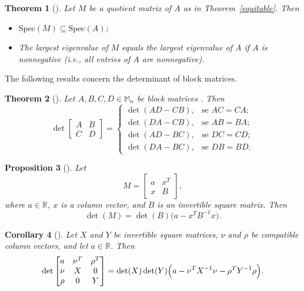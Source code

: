 \documentclass{article}
\newtheorem{theorem}{Theorem}[section]
\newtheorem{corollary}[theorem]{Corollary}
\newtheorem{proposition}[theorem]{Proposition}
\begin{document}
\begin{theorem}[\cite{YOU2019}] \label{quociente}
Let $M$ be a quotient matrix of $A$ as in Theorem~\ref{equitable}. Then
\begin{itemize}
\item[(i)] $\mathrm{Spec}(M) \subseteq \mathrm{Spec}(A)$;
\item[(ii)] The largest eigenvalue of $M$ equals the largest eigenvalue of $A$ if $A$ is nonnegative (i.e., all entries of $A$ are nonnegative).
\end{itemize}
\end{theorem}

The following results concern the determinant of block matrices.

\begin{theorem}[\cite{horn_johnson_2013}] \label{determinante}Let \( A, B, C, D \in \mathbb{M}_n \) be block matrices . Then
    \[
    \det
    \begin{bmatrix}
    A & B \\
    C & D
    \end{bmatrix} =
    \begin{cases}
    \det(AD - CB), & \text{se } AC = CA; \\
    \det(DA - CB), & \text{se } AB = BA; \\
    \det(AD - BC), & \text{se } DC = CD; \\
    \det(DA - BC), & \text{se } DB = BD.
    \end{cases}
    \]
\end{theorem}

\begin{proposition}[\cite{horn_johnson_2013}]\label{prop:schur-scalar}
Let
\[
M=
\begin{bmatrix}
a & x^T\\
x & B
\end{bmatrix},
\]
where $a\in\mathbb{R}$, $x$ is a column vector, and $B$ is an invertible square matrix. Then
\[
\det(M)=\det(B)\bigl(a-x^TB^{-1}x\bigr).
\]
\end{proposition}

\begin{corollary}[\cite{horn_johnson_2013}]\label{cor:schur-blockdiag}
Let $X$ and $Y$ be invertible square matrices, $\nu$ and $\rho$ be compatible column vectors, and let $a\in\mathbb{R}$. Then
\[
\det
\begin{bmatrix}
a & \nu^T & \rho^T\\
\nu & X & 0\\
\rho & 0 & Y
\end{bmatrix}
=
\det(X)\det(Y)\Bigl(a-\nu^TX^{-1}\nu-\rho^TY^{-1}\rho\Bigr).
\]
\end{corollary}
\end{document}
